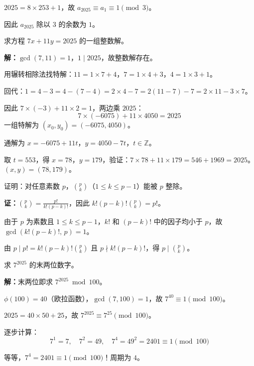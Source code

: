 \documentclass[12pt, a4paper]{ctexart}
\begin{document}
$2025 = 8 \times 253 + 1$，故 $a_{2025} \equiv a_1 \equiv 1 \pmod{3}$。

因此 $a_{2025}$ 除以 $3$ 的余数为 $\boxed{1}$。

\begin{examplebox}
求方程 $7x + 11y = 2025$ 的一组整数解。
\end{examplebox}

\textbf{解：}$\gcd(7, 11) = 1$，$1 \mid 2025$，故整数解存在。

用辗转相除法找特解：$11 = 1 \times 7 + 4$，$7 = 1 \times 4 + 3$，$4 = 1 \times 3 + 1$。

回代：$1 = 4 - 3 = 4 - (7 - 4) = 2 \times 4 - 7 = 2(11 - 7) - 7 = 2 \times 11 - 3 \times 7$。

因此 $7 \times (-3) + 11 \times 2 = 1$，两边乘 $2025$：
\[ 7 \times (-6075) + 11 \times 4050 = 2025 \]
一组特解为 $(x_0, y_0) = (-6075, 4050)$。

通解为 $x = -6075 + 11t$，$y = 4050 - 7t$，$t \in \mathbb{Z}$。

取 $t = 553$，得 $x = 78$，$y = 179$，验证：$7 \times 78 + 11 \times 179 = 546 + 1969 = 2025$。$\boxed{(x, y) = (78, 179)}$。

\begin{examplebox}[【例题6】组合数整除]
证明：对任意素数 $p$，$\binom{p}{k}$（$1 \le k \le p-1$）能被 $p$ 整除。
\end{examplebox}

\textbf{证：}$\displaystyle\binom{p}{k} = \frac{p!}{k!(p-k)!}$，因此 $k!(p-k)!\binom{p}{k} = p!$。

由于 $p$ 为素数且 $1 \le k \le p-1$，$k!$ 和 $(p-k)!$ 中的因子均小于 $p$，故 $\gcd(k!(p-k)!,\, p) = 1$。

由 $p \mid p! = k!(p-k)!\binom{p}{k}$ 且 $p \nmid k!(p-k)!$，得 $p \mid \binom{p}{k}$。

\begin{examplebox}[【例题7】幂的末两位]
求 $7^{2025}$ 的末两位数字。
\end{examplebox}

\textbf{解：}末两位即求 $7^{2025} \bmod 100$。

$\phi(100) = 40$（欧拉函数），$\gcd(7, 100) = 1$，故 $7^{40} \equiv 1 \pmod{100}$。

$2025 = 40 \times 50 + 25$，故 $7^{2025} \equiv 7^{25} \pmod{100}$。

逐步计算：
\[ 7^1 = 7,\quad 7^2 = 49,\quad 7^4 = 49^2 = 2401 \equiv 1 \pmod{100} \]

等等，$7^4 = 2401 \equiv 1 \pmod{100}$！周期为 $4$。
\end{document}
